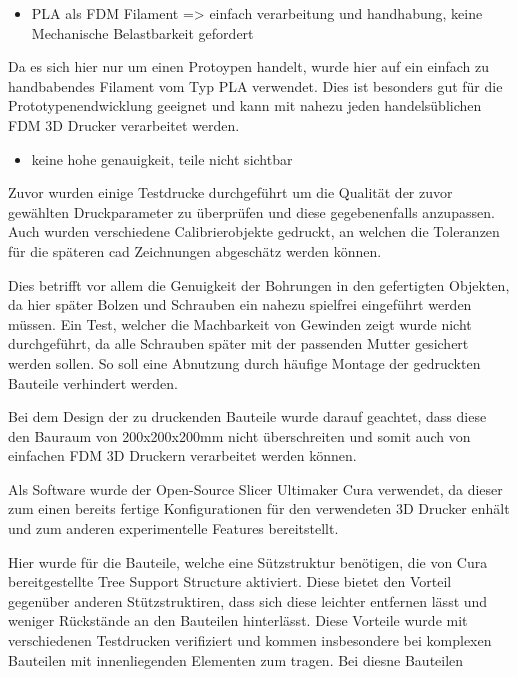 \begin{itemize}
\tightlist
\item
  PLA als FDM Filament =\textgreater{} einfach verarbeitung und
  handhabung, keine Mechanische Belastbarkeit gefordert
\end{itemize}

Da es sich hier nur um einen Protoypen handelt, wurde hier auf ein
einfach zu handbabendes Filament vom Typ PLA verwendet. Dies ist
besonders gut für die Prototypenendwicklung geeignet und kann mit nahezu
jeden handelsüblichen FDM 3D Drucker verarbeitet werden.

\begin{itemize}
\tightlist
\item
  keine hohe genauigkeit, teile nicht sichtbar
\end{itemize}

Zuvor wurden einige Testdrucke durchgeführt um die Qualität der zuvor
gewählten Druckparameter zu überprüfen und diese gegebenenfalls
anzupassen. Auch wurden verschiedene Calibrierobjekte gedruckt, an
welchen die Toleranzen für die späteren \gls{cad} Zeichnungen abgeschätz
werden können.

Dies betrifft vor allem die Genuigkeit der Bohrungen in den gefertigten
Objekten, da hier später Bolzen und Schrauben ein nahezu spielfrei
eingeführt werden müssen. Ein Test, welcher die Machbarkeit von Gewinden
zeigt wurde nicht durchgeführt, da alle Schrauben später mit der
passenden Mutter gesichert werden sollen. So soll eine Abnutzung durch
häufige Montage der gedruckten Bauteile verhindert werden.

Bei dem Design der zu druckenden Bauteile wurde darauf geachtet, dass
diese den Bauraum von 200x200x200mm nicht überschreiten und somit auch
von einfachen FDM 3D Druckern verarbeitet werden können.

Als Software wurde der Open-Source Slicer Ultimaker Cura
\cite{ultimakercura} verwendet, da dieser zum einen bereits fertige
Konfigurationen für den verwendeten 3D Drucker enhält und zum anderen
experimentelle Features bereitstellt.

Hier wurde für die Bauteile, welche eine Sützstruktur benötigen, die von
Cura bereitgestellte Tree Support Structure aktiviert. Diese bietet den
Vorteil gegenüber anderen Stützstruktiren, dass sich diese leichter
entfernen lässt und weniger Rückstände an den Bauteilen hinterlässt.
Diese Vorteile wurde mit verschiedenen Testdrucken verifiziert und
kommen insbesondere bei komplexen Bauteilen mit innenliegenden Elementen
zum tragen. Bei diesne Bauteilen

